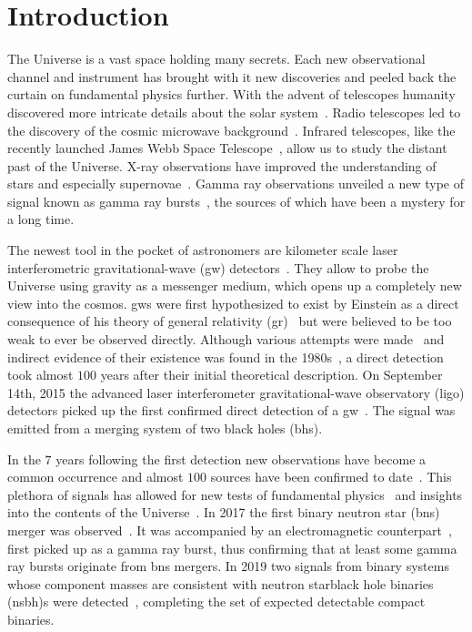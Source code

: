 \chapter{Introduction}
The Universe is a vast space holding many secrets. Each new observational channel and instrument has brought with it new discoveries and peeled back the curtain on fundamental physics further. With the advent of telescopes humanity discovered more intricate details about the solar system~\cite{Herschel:2012aaa}. Radio telescopes led to the discovery of the cosmic microwave background~\cite{Penzias:1965aaa}. Infrared telescopes, like the recently launched James Webb Space Telescope~\cite{Gardner:2006ky}, allow us to study the distant past of the Universe. X-ray observations have improved the understanding of stars and especially supernovae~\cite{Hughes:2000aaa}. Gamma ray observations unveiled a new type of signal known as gamma ray bursts~\cite{Klebesadel:1973aaa}, the sources of which have been a mystery for a long time.

The newest tool in the pocket of astronomers are kilometer scale laser interferometric gravitational-wave (\acrshort{gw}) detectors~\cite{LIGOScientific:2014pky, VIRGO:2014yos, KAGRA:2018plz, Luck:2010rt}. They allow to probe the Universe using gravity as a messenger medium, which opens up a completely new view into the cosmos. \acrshort{gw}s were first hypothesized to exist by Einstein as a direct consequence of his theory of general relativity (\acrshort{gr})~\cite{Einstein:1916aaa} but were believed to be too weak to ever be observed directly. Although various attempts were made~\cite{Weber:1960zz} and indirect evidence of their existence was found in the 1980s~\cite{Taylor:1982zz}, a direct detection took almost $100$ years after their initial theoretical description. On September 14th, 2015 the advanced laser interferometer gravitational-wave observatory (\acrshort{ligo}) detectors picked up the first confirmed direct detection of a \acrshort{gw}~\cite{LIGOScientific:2016aoc}. The signal was emitted from a merging system of two black holes (\acrshort{bh}s).

In the $7$ years following the first detection new observations have become a common occurrence and almost $100$ sources have been confirmed to date~\cite{LIGOScientific:2021djp, Nitz:2021zwj}. This plethora of signals has allowed for new tests of fundamental physics~\cite{LIGOScientific:2016lio, LIGOScientific:2021sio, LIGOScientific:2018cki, Capano:2019eae, LIGOScientific:2018gmd, DES:2019ccw} and insights into the contents of the Universe~\cite{LIGOScientific:2021psn, LIGOScientific:2021job}. In 2017 the first binary neutron star (\acrshort{bns}) merger was observed~\cite{LIGOScientific:2017vwq}. It was accompanied by an electromagnetic counterpart~\cite{Coulter:2017wya, DES:2017kbs, LIGOScientific:2017ync}, first picked up as a gamma ray burst, thus confirming that at least some gamma ray bursts originate from \acrshort{bns} mergers. In 2019 two signals from binary systems whose component masses are consistent with neutron star\textendash{}black hole binaries (\acrshort{nsbh})s were detected~\cite{LIGOScientific:2021qlt}, completing the set of expected detectable compact binaries.


